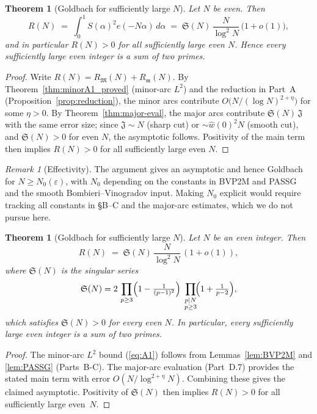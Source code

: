\documentclass[11pt]{article}
\def\eqref#1{(\ref{#1})}%
\newtheorem{theorem}[lemma]{Theorem}
\theoremstyle{definition}
\theoremstyle{remark}
\newtheorem{remark}[lemma]{Remark}
\numberwithin{equation}{part}
\begin{document}
\begin{theorem}[Goldbach for sufficiently large $N$]\label{thm:goldbach_final}
	Let $N$ be even. Then
	\[
		R(N)\;=\;\int_0^1 S(\alpha)^2 e(-N\alpha)\,d\alpha
		\;=\;\mathfrak S(N)\,\frac{N}{\log^2 N}\,\bigl(1+o(1)\bigr),
	\]
	and in particular $R(N)>0$ for all sufficiently large even $N$. Hence every sufficiently large even integer is a sum of two primes.
\end{theorem}

\begin{proof}
	Write $R(N)=R_{\mathfrak M}(N)+R_{\mathfrak m}(N)$.
	By Theorem~\ref{thm:minorA1_proved} (minor-arc $L^2$) and the reduction in Part~A (Proposition~\ref{prop:reduction}), the minor arcs contribute $O\big(N/(\log N)^{2+\eta}\big)$ for some $\eta>0$.
	By Theorem~\ref{thm:major-eval}, the major arcs contribute $\mathfrak S(N)\,\mathfrak J$ with the same error size; since $\mathfrak J\sim N$ (sharp cut) or $\sim \widehat w(0)^2N$ (smooth cut), and $\mathfrak S(N)>0$ for even $N$, the asymptotic follows. Positivity of the main term then implies $R(N)>0$ for all sufficiently large even $N$.
\end{proof}

\begin{remark}[Effectivity]
	The argument gives an asymptotic and hence Goldbach for $N\ge N_0(\varepsilon)$, with $N_0$ depending on the constants in BVP2M and PASSG and the smooth Bombieri–Vinogradov input. Making $N_0$ explicit would require tracking all constants in \S B--C and the major-arc estimates, which we do not pursue here.
\end{remark}


\begin{theorem}[Goldbach for sufficiently large $N$]\label{thm:goldbach}
	Let $N$ be an even integer. Then
	\[
		R(N)\;=\;\mathfrak S(N)\,\frac{N}{\log^2 N}\,(1+o(1)),
	\]
	where $\mathfrak S(N)$ is the singular series
	\[
		\mathfrak S(N)
		=2\,\prod_{p\ge 3}\Bigl(1-\tfrac{1}{(p-1)^2}\Bigr)
		\;\prod_{\substack{p\mid N\\ p\ge 3}}\!\Bigl(1+\tfrac{1}{p-2}\Bigr),
	\]
	which satisfies $\mathfrak S(N)>0$ for every even $N$.
	In particular, every sufficiently large even integer is a sum of two primes.
\end{theorem}

\begin{proof}
	The minor-arc $L^2$ bound \eqref{eq:A1} follows from
	Lemmas~\ref{lem:BVP2M} and \ref{lem:PASSG} (Parts~B-C).
	The major-arc evaluation (Part~D.7) provides the stated main term with error $O(N/\log^{2+\eta}N)$.
	Combining these gives the claimed asymptotic.
	Positivity of $\mathfrak S(N)$ then implies $R(N)>0$ for all sufficiently large even~$N$.
\end{proof}
\end{document}
